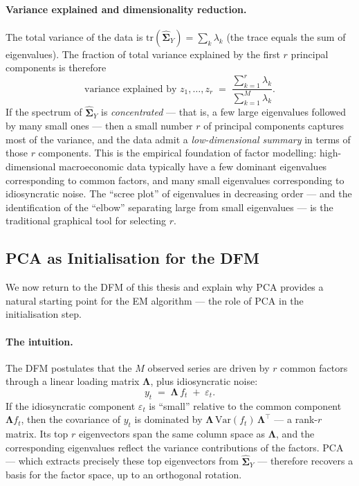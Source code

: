 \documentclass[11pt, a4paper, oneside]{article}
\newcommand{\mL}{\boldsymbol{\Lambda}}
\begin{document}
\paragraph{Variance explained and dimensionality reduction.}
The total variance of the data is $\mathrm{tr}(\widehat{\boldsymbol{\Sigma}}_Y) = \sum_k \lambda_k$
(the trace equals the sum of eigenvalues). The fraction of total
variance explained by the first $r$ principal components is therefore
\[
\text{variance explained by } z_1, \ldots, z_r \;=\; \frac{\sum_{k=1}^r \lambda_k}{\sum_{k=1}^M \lambda_k}.
\]
If the spectrum of $\widehat{\boldsymbol{\Sigma}}_Y$ is
\emph{concentrated} — that is, a few large eigenvalues followed by
many small ones — then a small number $r$ of principal components
captures most of the variance, and the data admit a
\emph{low-dimensional summary} in terms of those $r$ components.
This is the empirical foundation of factor modelling: high-dimensional
macroeconomic data typically have a few dominant eigenvalues
corresponding to common factors, and many small eigenvalues
corresponding to idiosyncratic noise. The ``scree plot'' of
eigenvalues in decreasing order — and the identification of the
``elbow'' separating large from small eigenvalues — is the
traditional graphical tool for selecting $r$.

\subsection{PCA as Initialisation for the DFM}
\label{subsec:pca-init}

We now return to the DFM of this thesis and explain why PCA provides
a natural starting point for the EM algorithm — the role of PCA in
the initialisation step.

\paragraph{The intuition.}
The DFM postulates that the $M$ observed series are driven by $r$
common factors through a linear loading matrix $\mL$, plus
idiosyncratic noise:
\[
y_t \;=\; \mL\, f_t \;+\; \varepsilon_t.
\]
If the idiosyncratic component $\varepsilon_t$ is ``small'' relative
to the common component $\mL f_t$, then the covariance of $y_t$ is
dominated by
$\mL\, \mathrm{Var}(f_t)\, \mL^{\top}$ — a rank-$r$ matrix. Its top
$r$ eigenvectors span the same column space as $\mL$, and the
corresponding eigenvalues reflect the variance contributions of the
factors. PCA — which extracts precisely these top eigenvectors from
$\widehat{\boldsymbol{\Sigma}}_Y$ — therefore recovers a basis for
the factor space, up to an orthogonal rotation.
\end{document}

